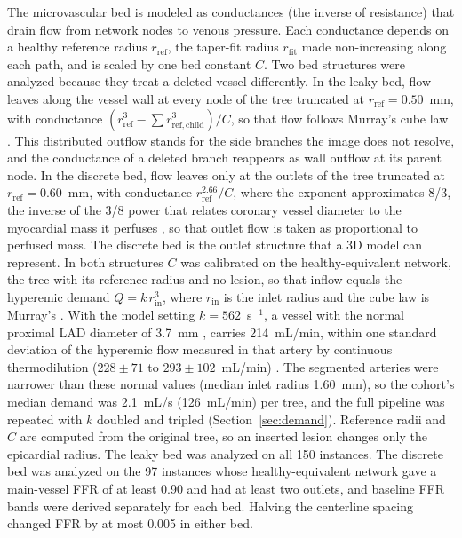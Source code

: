 \documentclass[journal]{IEEEtran}
\begin{document}
The microvascular bed is modeled as conductances (the inverse of resistance) that drain flow from network nodes to
venous pressure. Each conductance depends on a healthy reference radius $r_\mathrm{ref}$, the taper-fit radius
$r_\mathrm{fit}$ made non-increasing along each path, and is scaled by one bed constant $C$. Two bed structures were analyzed because they treat a deleted vessel differently. In the leaky
bed, flow leaves along the vessel wall at every node of the tree truncated at $r_\mathrm{ref} = 0.50$~mm, with
conductance $(r_\mathrm{ref}^3 - \sum r_{\mathrm{ref},\mathrm{child}}^3)/C$, so that flow follows Murray's cube law
\cite{murray1926}. This distributed outflow stands for the side branches the image does not resolve, and the
conductance of a deleted branch reappears as wall outflow at its parent node. In the discrete bed, flow leaves only
at the outlets of the tree truncated at $r_\mathrm{ref} = 0.60$~mm, with conductance $r_\mathrm{ref}^{2.66}/C$,
where the exponent approximates 8/3, the inverse of the 3/8 power that relates coronary vessel diameter to the
myocardial mass it perfuses \cite{choy2008}, so that outlet flow is taken as proportional to perfused mass. The discrete bed is the outlet structure that a 3D model can
represent. In both structures $C$ was calibrated on the healthy-equivalent network, the tree with its reference
radius and no lesion, so that inflow equals the hyperemic demand $Q = k\,r_\mathrm{in}^3$, where $r_\mathrm{in}$ is
the inlet radius and the cube law is Murray's \cite{murray1926}. With the model setting $k = 562$~s$^{-1}$, a
vessel with the normal proximal LAD diameter of 3.7~mm \cite{dodge1992}, carries 214~mL/min,
within one standard deviation of the hyperemic flow measured in that artery by continuous thermodilution
($228 \pm 71$ to $293 \pm 102$~mL/min) \cite{fournier2021}. The segmented arteries were narrower than these
normal values (median inlet radius 1.60~mm), so the cohort's median demand was 2.1~mL/s (126~mL/min) per tree, and
the full pipeline was repeated with $k$ doubled and tripled (Section~\ref{sec:demand}). Reference radii and $C$ are computed from the original tree, so an inserted lesion changes
only the epicardial radius. The leaky bed was analyzed on all 150 instances. The discrete bed was analyzed on the
97 instances whose healthy-equivalent network gave a main-vessel FFR of at least 0.90 and had at least two outlets,
and baseline FFR bands were derived separately for each bed. Halving the centerline spacing changed FFR by at most
0.005 in either bed.
\end{document}
